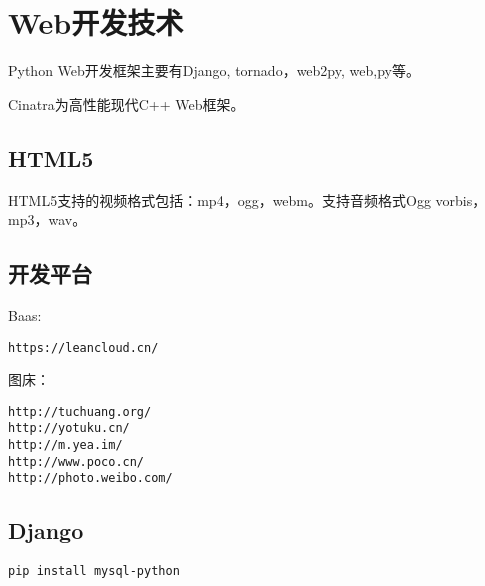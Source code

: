 \section{Web开发技术}


Python Web开发框架主要有Django, tornado，web2py, web,py等。

Cinatra为高性能现代C++ Web框架。

\subsection{HTML5}
HTML5支持的视频格式包括：mp4，ogg，webm。支持音频格式Ogg vorbis，mp3，wav。

\subsection{开发平台}


Baas:
\begin{verbatim}
https://leancloud.cn/
\end{verbatim}

图床：
\begin{verbatim}
http://tuchuang.org/
http://yotuku.cn/
http://m.yea.im/
http://www.poco.cn/
http://photo.weibo.com/
\end{verbatim}


\subsection{Django}


\begin{verbatim}
pip install mysql-python
\end{verbatim}



